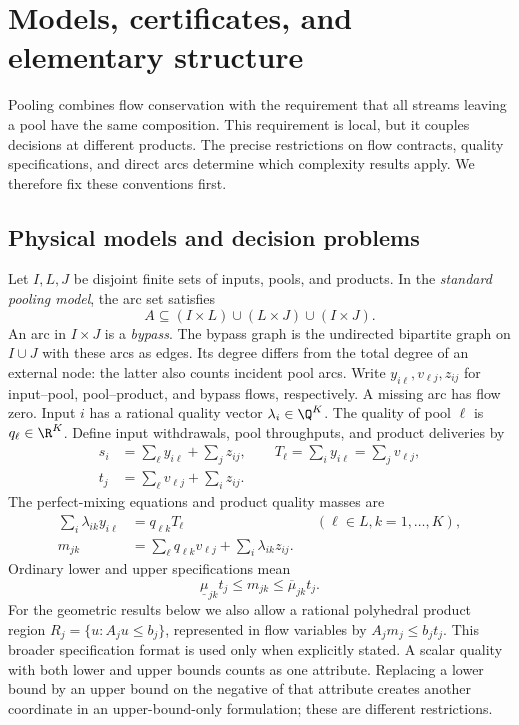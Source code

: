 \section{Models, certificates, and elementary structure}\label{s1:foundations}

Pooling combines flow conservation with the requirement that all streams
leaving a pool have the same composition. This requirement is local, but
it couples decisions at different products. The precise restrictions on
flow contracts, quality specifications, and direct arcs determine which
complexity results apply. We therefore fix these conventions first.

\subsection{Physical models and decision problems}\label{s1:model}

Let $I,L,J$ be disjoint finite sets of inputs, pools, and products.
In the \emph{standard pooling model}, the arc set satisfies
\[
 A\subseteq(I\times L)\cup(L\times J)\cup(I\times J).
\]
An arc in $I\times J$ is a \emph{bypass}. The bypass graph is the
undirected bipartite graph on $I\cup J$ with these arcs as edges.
Its degree differs from the total degree of an external node: the latter
also counts incident pool arcs. Write $y_{i\ell},v_{\ell j},z_{ij}$ for
input--pool, pool--product, and bypass flows, respectively. A missing arc
has flow zero. Input $i$ has a rational quality vector
$\lambda_i\in\Q^K$. The quality of pool $\ell$ is $q_\ell\in\R^K$.
Define input withdrawals, pool throughputs, and product deliveries by
\begin{align}
 s_i&=\sum_\ell y_{i\ell}+\sum_jz_{ij},\qquad
 T_\ell=\sum_i y_{i\ell}=\sum_jv_{\ell j},\label{s1:mass}\\
 t_j&=\sum_\ell v_{\ell j}+\sum_i z_{ij}.
\end{align}
The perfect-mixing equations and product quality masses are
\begin{align}
 \sum_i\lambda_{ik}y_{i\ell}&=q_{\ell k}T_\ell
       &&(\ell\in L, k=1,\ldots,K),\label{s1:mixing}\\
 m_{jk}&=\sum_\ell q_{\ell k}v_{\ell j}
                +\sum_i\lambda_{ik}z_{ij}.
\end{align}
Ordinary lower and upper specifications mean
\begin{equation}
 \underline\mu_{jk}t_j\le m_{jk}\le\overline\mu_{jk}t_j.
 \label{s1:quality}
\end{equation}
For the geometric results below we also allow a rational polyhedral
product region $R_j=\{u:A_ju\le b_j\}$, represented in flow variables by
$A_jm_j\le b_jt_j$. This broader specification format is used only when
explicitly stated. A scalar quality with both lower and upper bounds
counts as one attribute. Replacing a lower bound by an upper bound on the
negative of that attribute creates another coordinate in an
upper-bound-only formulation; these are different restrictions.

